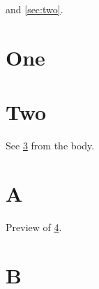 
 and \autoref{sec:two}.
\section{One}\label{sec:one}
\section{Two}\label{sec:two}
See \ref{app:a} from the body.
\begin{appendices}
\section{A}\label{app:a}
Preview of \ref{app:b}.
\section{B}\label{app:b}
\end{appendices}

